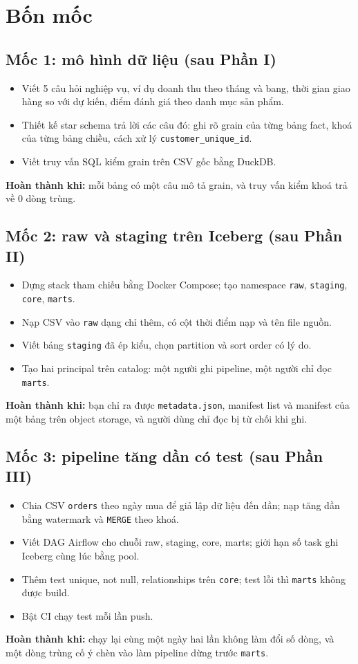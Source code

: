 \documentclass[11pt,a4paper,oneside]{report}
\newcommand{\code}[1]{\texttt{#1}}
\newcommand{\hoanthanh}[1]{\par\smallskip\textbf{\sffamily\small\color{accent}Hoàn thành khi:} #1\par}
\begin{document}
\section{Bốn mốc}

\subsection{Mốc 1: mô hình dữ liệu (sau Phần I)}
\begin{itemize}
  \item Viết 5 câu hỏi nghiệp vụ, ví dụ doanh thu theo tháng và bang, thời gian giao hàng so với dự kiến, điểm đánh giá theo danh mục sản phẩm.
  \item Thiết kế star schema trả lời các câu đó: ghi rõ grain của từng bảng fact, khoá của từng bảng chiều, cách xử lý \code{customer\_unique\_id}.
  \item Viết truy vấn SQL kiểm grain trên CSV gốc bằng DuckDB.
\end{itemize}
\hoanthanh{mỗi bảng có một câu mô tả grain, và truy vấn kiểm khoá trả về 0 dòng trùng.}

\subsection{Mốc 2: raw và staging trên Iceberg (sau Phần II)}
\begin{itemize}
  \item Dựng stack tham chiếu bằng Docker Compose; tạo namespace \code{raw}, \code{staging}, \code{core}, \code{marts}.
  \item Nạp CSV vào \code{raw} dạng chỉ thêm, có cột thời điểm nạp và tên file nguồn.
  \item Viết bảng \code{staging} đã ép kiểu, chọn partition và sort order có lý do.
  \item Tạo hai principal trên catalog: một người ghi pipeline, một người chỉ đọc \code{marts}.
\end{itemize}
\hoanthanh{bạn chỉ ra được \code{metadata.json}, manifest list và manifest của một bảng trên object storage, và người dùng chỉ đọc bị từ chối khi ghi.}

\subsection{Mốc 3: pipeline tăng dần có test (sau Phần III)}
\begin{itemize}
  \item Chia CSV \code{orders} theo ngày mua để giả lập dữ liệu đến dần; nạp tăng dần bằng watermark và \code{MERGE} theo khoá.
  \item Viết DAG Airflow cho chuỗi raw, staging, core, marts; giới hạn số task ghi Iceberg cùng lúc bằng pool.
  \item Thêm test unique, not null, relationships trên \code{core}; test lỗi thì \code{marts} không được build.
  \item Bật CI chạy test mỗi lần push.
\end{itemize}
\hoanthanh{chạy lại cùng một ngày hai lần không làm đổi số dòng, và một dòng trùng cố ý chèn vào làm pipeline dừng trước \code{marts}.}
\end{document}
